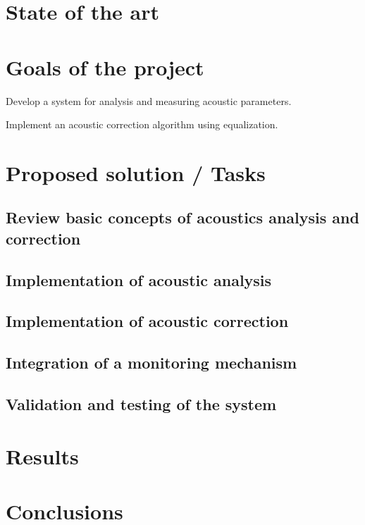 \documentclass[12,twoside]{TFG-GCED}
\begin{document}
\section{State of the art}

\section{Goals of the project}

Develop a system for analysis and measuring acoustic parameters.

Implement an acoustic correction algorithm using equalization.

\section{Proposed solution / Tasks}

\subsection{Review basic concepts of acoustics analysis and correction}

\subsection{Implementation of acoustic analysis}

\subsection{Implementation of acoustic correction}

\subsection{Integration of a monitoring mechanism}

\subsection{Validation and testing of the system}

\section{Results}

\section{Conclusions}
\end{document}
